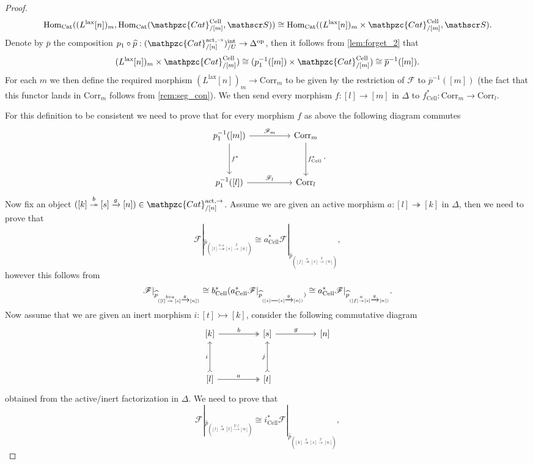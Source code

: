 \documentclass[a4paper, reqno]{amsart}
\theoremstyle{definition}
\newcommand\cF{\mathscr F}
\newcommand\cS{\mathscr S}
\newcommand\mor{\mathrm{Hom}}
\newcommand\op{\mathrm{op}}
\newcommand\cat{\mathrm{Cat}}
\newcommand\ccat{\mathpzc{Cat}}
\newcommand\corr{\mathrm{Corr}}
\newcommand\cell{\mathrm{Cell}}
\newcommand\lax{\mathrm{lax}}
\newcommand\act{\mathrm{act}}
\newcommand\inrt{\mathrm{int}}
\begin{document}
\begin{proof}
\begin{equation}\label{eq:four}
    \mor_\cat((L^\lax[n])_m,\mor_\cat(\ccat^\cell_{/[m]},\cS))\cong\mor_\cat((L^\lax[n])_m\times \ccat^\cell_{/[m]},\cS).
\end{equation}
Denote by $\overline{p}$ the composition $p_1\circ\widehat{p}:(\ccat_{/[n]}^{\act,\rightarrow})^\inrt_{/U}\rightarrow\Delta^\op$, then it follows from \cref{lem:forget_2} that 
\[(L^\lax[n])_m\times \ccat^\cell_{/[m]})\cong (p_1^{-1}([m])\times \ccat^\cell_{/[m]})\cong \overline{p}^{-1}([m]).\]
For each $m$ we then define the required morphism $(L^\lax[n])_m\rightarrow\corr_m$ to be given by the restriction of $\cF$ to $\overline{p}^{-1}([m])$ (the fact that this functor lands in $\corr_m$ follows from \cref{rem:seg_con}). We then send every morphism $f:[l]\rightarrow[m]$ in $\Delta$ to $f^*_\cell:\corr_m\rightarrow\corr_l$. \par
For this definition to be consistent we need to prove that for every morphism $f$ as above the following diagram commutes
\[
\begin{tikzcd}[row sep=huge, column sep=huge]
p_1^{-1}({[m]})\arrow[r, "\cF_m"]\arrow[d, "f^*"]&\corr_m\arrow[d, "f^*_\cell"]\\
p_1^{-1}({[l]})\arrow[r, "\cF_l"]&\corr_l
\end{tikzcd}.
\]
Now fix an object $([k]\overset{b}{\twoheadrightarrow}[s]\xrightarrow{g}[n])\in\ccat^{\act,\rightarrow}_{/[n]}$. Assume we are given an active morphism $a:[l]\twoheadrightarrow[k]$ in $\Delta$, then we need to prove that 
\[\cF|_{\widehat{p}_{([l]\overset{b\circ a}{\twoheadrightarrow}[s]\xrightarrow{g}[n])}}\cong a^*_\cell\cF|_{\widehat{p}_{({[f]\overset{a}{\twoheadrightarrow}[s]\xrightarrow{g}[n]})}},\]
however this follows from 
\[\cF|_{\widehat{p}_{([l]\overset{b\circ a}{\twoheadrightarrow}[s]\xrightarrow{g}[n])}}\cong b^*_\cell( a^*_\cell\cF|_{\widehat{p}_{([s]=\joinrel=[s]\xrightarrow{g}[n])})}\cong a^*_\cell\cF|_{\widehat{p}_{([f]\overset{a}{\twoheadrightarrow}[s]\xrightarrow{g}[n])}}.\]
Now assume that we are given an inert morphism $i:[t]\rightarrowtail[k]$, consider the following commutative diagram
\[
\begin{tikzcd}[row sep=huge, column sep=huge]
{[k]}\arrow[r, two heads, "b"]&{[s]}\arrow[r, "g"]&{[n]}\\
{[l]}\arrow[u, tail, "i"]\arrow[r, two heads, "a"]&{[t]}\arrow[u, tail, "j"]
\end{tikzcd}
\]
obtained from the active/inert factorization in $\Delta$. We need to prove that \[\cF|_{\widehat{p}_{([l]\overset{a}{\twoheadrightarrow}[t]\xrightarrow{g\circ j}[n])}}\cong i^*_\cell\cF|_{\widehat{p}_{([k]\overset{b}{\twoheadrightarrow}[s]\xrightarrow{g}[n])}},\] 

\end{proof}
\end{document}
